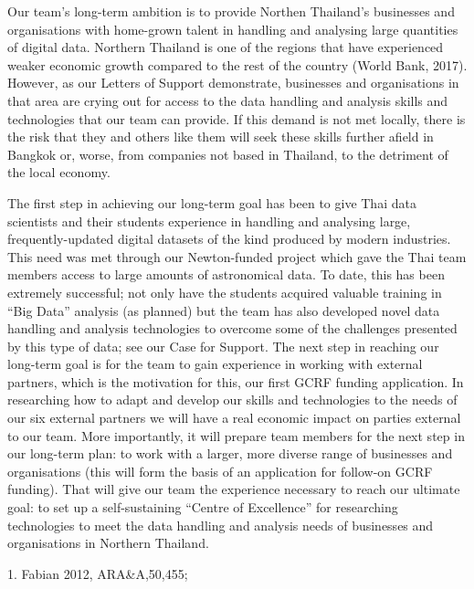\documentclass[11pt]{article}
\begin{document}
\vspace{2mm}
\noindent
Our team's long-term ambition is to provide Northen Thailand's businesses and organisations with home-grown talent in handling and analysing large quantities of digital data. Northern Thailand is one of the regions that have experienced weaker economic growth compared to the rest of the country (World Bank, 2017). However, as our Letters of Support demonstrate, businesses and organisations in that area are crying out for access to the data handling and analysis skills and technologies that our team can provide. If this demand is not met locally, there is the risk that they and others like them will seek these skills further afield in Bangkok or, worse, from companies not based in Thailand, to the detriment of the local economy.

\vspace{2mm}
\noindent
The first step in achieving our long-term goal has been to give Thai data scientists and their students experience in handling and analysing large, frequently-updated digital datasets of the kind produced by modern industries. This need was met through our Newton-funded project which gave the Thai team members access to large amounts of astronomical data. To date, this has been extremely successful; not only have the students acquired valuable training in ``Big Data'' analysis (as planned) but the team has also developed novel data handling and analysis technologies to overcome some of the challenges presented by this type of data; see our Case for Support. The next step in reaching our long-term goal is for the team to gain experience in working with external partners, which is the motivation for this, our first GCRF funding application. In researching how to adapt and develop our skills and technologies to the needs of our six external partners we will have a real economic impact on parties external to our team. More importantly, it will prepare team members for the next step in our long-term plan: to work with a larger, more diverse range of businesses and organisations (this will form the basis of an application for follow-on GCRF funding). That will give our team the experience necessary to reach our ultimate goal: to set up a self-sustaining ``Centre of Excellence'' for researching technologies to meet the data handling and analysis needs of businesses and organisations in Northern Thailand.

\vspace{10mm}
 {\scriptsize 1. Fabian 2012,
  ARA\&A,50,455;
}
\end{document}
